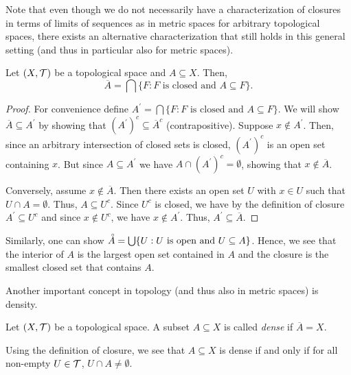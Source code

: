 \documentclass{article}
\begin{document}
Note that even though we do not necessarily have a characterization of closures in terms of limits of sequences as in metric spaces for arbitrary topological spaces, there exists an alternative characterization that still holds in this general setting (and thus in particular also for metric spaces).

\begin{proposition}
\label{prop:closed}
 Let $(X,\mathcal{T})$ be a topological space and $A\subseteq X$. Then,
 \begin{equation*}
     \overline{A} = \bigcap \{F \colon F \text{ is closed and } A \subseteq F\}.
 \end{equation*}
\end{proposition}
\begin{proof}
For convenience define $A^\prime = \bigcap \{F \colon F \text{ is closed and } A \subseteq F\}$. We will show $ \overline{A}\subseteq A^\prime$ by showing that $(A^\prime)^c \subseteq \overline{A}^c$ (contrapositive). Suppose $x\not \in A^\prime$. Then, since an arbitrary intersection of closed sets is closed, $(A^\prime)^c$ is an open set containing $x$. But since $A \subseteq A^\prime$ we have $A\cap (A^\prime)^c = \emptyset$, showing that $x\not \in \overline{A}$. 

Conversely, assume $x\not \in \overline{A}$. Then there exists an open set $U$ with $x\in U$ such that $U\cap A = \emptyset$. Thus, $A\subseteq U^c$. Since $U^c$ is closed, we have by the definition of closure $A^\prime \subseteq U^c$ and since $x\not \in U^c$, we have $x\not \in A^\prime$. Thus, $A^\prime\subseteq \overline{A}$.
\end{proof}

Similarly, one can show $\accentset{\circ} A =\bigcup \{U: U \text{ is open and } U \subseteq A \}$. Hence, we see that the interior of $A$ is the largest open set contained in $A$ and the closure is the smallest closed set that contains $A$.

Another important concept in topology (and thus also in metric spaces) is density. 

\begin{definition}
Let $(X,\mathcal{T})$ be a topological space. A subset $A\subseteq X$ is called \emph{dense} if $\overline{A} = X$.
\end{definition}

Using the definition of closure, we see that $A\subseteq X$ is dense if and only if for all non-empty $U\in \mathcal{T}$, $U\cap A \neq \emptyset$.
\end{document}
